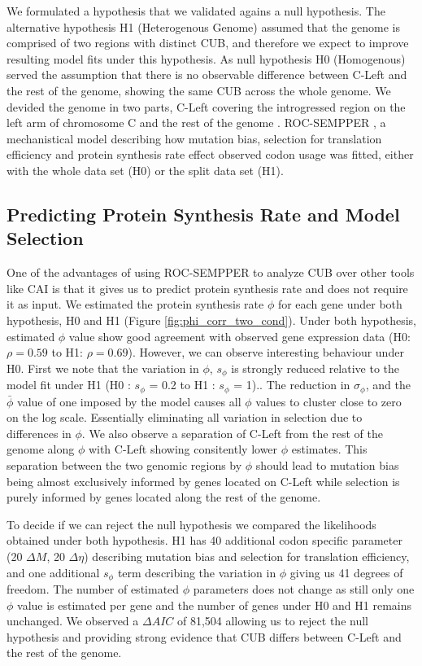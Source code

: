 \documentclass[12pt]{article}
\begin{document}
We formulated a hypothesis that we validated agains a null hypothesis. 
The alternative hypothesis H1 (Heterogenous Genome) assumed that the \kluyveri genome is comprised of two regions with distinct CUB, and therefore we expect to improve resulting model fits under this hypothesis. 
As null hypothesis H0 (Homogenous) served the assumption that there is no observable difference between C-Left and the rest of the \kluyveri genome, showing the same CUB across the whole genome.
We devided the \kluyveri genome in two parts, C-Left covering the introgressed region on the left arm of chromosome C and the rest of the \kluyveri genome \citep{payen2009}.
ROC-SEMPPER \citep{gilchrist2015}, a mechanistical model describing how mutation bias, selection for translation efficiency and protein synthesis rate effect observed codon usage was fitted, either with the whole data set (H0) or the split data set (H1).

\subsection*{Predicting Protein Synthesis Rate and Model Selection}
One of the advantages of using ROC-SEMPPER to analyze CUB over other tools like CAI \citep{sharp1987} is that it gives us to predict protein synthesis rate and does not require it as input.
We estimated the protein synthesis rate $\phi$ for each gene under both hypothesis, H0 and H1 (Figure \ref{fig:phi_corr_two_cond}). 
Under both hypothesis, estimated $\phi$ value show good agreement with observed gene expression data (H0: $\rho = 0.59$ to H1: $\rho = 0.69$).
However, we can observe interesting behaviour under H0.
First we note that the variation in $\phi$, $s_\phi$ is strongly reduced relative to the model fit under H1 (H0 : $s_{\phi}$ = 0.2 to H1 : $s_{\phi}$ = 1).. 
The reduction in $\sigma_\phi$, and the $\bar{\phi}$ value of one imposed by the model causes all $\phi$ values to cluster close to zero on the log scale. 
Essentially eliminating all variation in selection due to differences in $\phi$.
We also observe a separation of C-Left from the rest of the \kluyveri genome along $\phi$ with C-Left showing consitently lower $\phi$ estimates.
This separation between the two genomic regions by $\phi$ should lead to mutation bias being almost exclusively informed by genes located on C-Left while selection is purely informed by genes located along the rest of the genome.

To decide if we can reject the null hypothesis we compared the likelihoods obtained under both hypothesis.
H1 has 40 additional codon specific parameter (20 $\Delta M$, 20 $\Delta \eta$) describing mutation bias and selection for translation efficiency, and one additional $s_\phi$ term describing the variation in $\phi$ giving us 41 degrees of freedom.
The number of estimated $\phi$ parameters does not change as still only one $\phi$ value is estimated per gene and the number of genes under H0 and H1 remains unchanged.
We observed a $\Delta AIC$ of 81,504 allowing us to reject the null hypothesis and providing strong evidence that CUB differs between C-Left and the rest of the \kluyveri genome.
\end{document}
